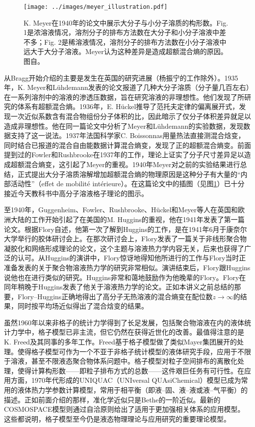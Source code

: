 \documentclass[main.tex]{subfiles}
\begin{document}
\begin{figure}[ht]
  \centering
  \texttt{[image: ../images/meyer\_illustration.pdf]}
  \caption{K. Meyer在1940年的论文中展示大分子与小分子溶质的构形数。Fig. 1是浓溶液情况，溶剂分子的排布方法数在大分子和小分子溶液中差不多；Fig. 2是稀溶液情况，溶剂分子的排布方法数在小分子溶液中远大于大分子溶液。Meyer认为这种差异是造成超额混合熵的原因。图自\cite{Meyer1940}。}
  \label{fig:meyer_illustration}
\end{figure}

从Bragg开始介绍的主要是发生在英国的研究进展（杨振宁的工作除外）。1935年，K. Meyer和Lühdemann发表的论文报道了几种大分子溶质（分子量几百左右）在一系列溶剂中的溶液的渗透压数据，旨在研究溶液的非理想性\cite{Meyer1935}。他们发现了所研究的体系有超额混合熵。1936年，E. Hückel\cite{Hueckel1936}推导了范托夫定律的偏离展开式，发现一次近似系数含有混合物组份分子体积的比，因此暗示了仅分子体积差异就足以造成非理想性。他在同一篇论文中分析了Meyer和Lühdemann的实验数据，发现数据支持了这一说法。1937年法国科学家C. Boissonnas用量热法直接测混合焓变，同时结合已报道的混合自由能数据计算混合熵变，发现了正的超额混合熵变\cite{Boissonnas1937}。前面提到过的Fowler和Rushbrooke在1937年的工作，理论上证实了分子尺寸差异足以造成超额混合熵变，这引起了Meyer的重视。1940年Meyer对之前的实验结果进行总结\cite{Meyer1940}，正式提出大分子溶质溶解增加超额混合熵的物理原因是这种分子有大量的“内部活动性”（effet de mobilité intérieure）。在这篇论文中的插图（见图\ref{fig:meyer_illustration}）已十分接近今天教科书中高分子溶液格子理论的图示。

至1940年，Guggenheim、Fowler、Rushbrooke、Hückel和Meyer等人在英国和欧洲大陆的工作开始引起了在美国的M. Huggins的重视，他在1941年发表了第一篇论文\cite{Huggins1941}。根据Flory自述\cite{Flory1985}，他第一次了解到Huggins的工作，是在1941年6月于康奈尔大学举行的胶体研讨会上。在那次研讨会上，Flory发表了一篇关于非线形聚合物凝胶化和网络形成理论的论文，这个主题与溶液热力学内容无关，后来也获得了广泛的认可。从Huggins的演讲中，Flory惊讶地得知他所进行的工作与Flory当时正准备发表的关于聚合物溶液热力学的研究非常相似。演讲结束后，Flory跟Huggins说他也在进行类似的研究。Huggins非常和蔼地鼓励作为他晚辈的Flory。Flory在同年稍晚于Huggins发表了他关于溶液热力学的论文\cite{Flory1941}。正如本讲义之前总结的那要，Flory--Huggins正确地得出了高分子无热溶液的混合熵变在配位数$z\to\infty$的结果，同时按平均场近似得出了混合焓变的结果。

虽然1960年以来非格子的统计力学得到了长足发展，包括聚合物溶液在内的液体统计力学中，格子模型已非主流，但它仍然在获得近世化的改善。最值得注意的是K. Freed及其同事的多年工作。Freed基于格子模型做了类似Mayer集团展开的处理。使得格子模型可作为一个不亚于非格子统计模型的液体研究手段\cite{Dudowicz1990}，应用于不限于溶液，甚至不限液态聚合物体系问题中\cite{Foreman1998,Dudowicz2007,Xu2016}。格子模型对粒子空间排布的离散化处理，使得计算构形数——即粒子排布方式的总数——这件艰巨任务有可行性。在应用方面，1970年代形成的UNIQUAC（UNIversal QUAsiChemical）模型\cite{Abrams1975,Maurer1978}已成为常用的液体热力学参数计算模型，常用于相平衡（即液--固、液--液或液--气平衡）的描述。正如前面介绍的那样，准化学近似只是Bethe的一阶近似。最新的COSMOSPACE模型\cite{Klamt2002}则通过自洽原则给出了适用于更加强相关体系的应用模型。这些都说明，格子模型至今仍是液态物理理论与应用研究的重要理论模型。
\end{document}
